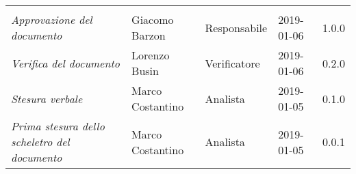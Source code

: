 \newpage 
\section*{}
\begin{table}[H]
	\centering
	\begin{tabular}{p{4cm}|C{3cm}|C{3cm}|R{2.5cm}|R{2cm}}
		
		 & & & & \\
		
		
		\emph{Approvazione del documento} &  Giacomo Barzon & Responsabile & 2019-01-06 & 1.0.0 \\
		\hline
		
		\emph{Verifica del documento} & Lorenzo Busin & Verificatore & 2019-01-06 & 0.2.0 \\
		\hline

		\emph{Stesura verbale} & Marco Costantino & Analista & 2019-01-05 & 0.1.0 \\
		\hline
		
		\emph{Prima stesura dello scheletro del documento} & Marco Costantino & Analista & 2019-01-05 & 0.0.1 \\
		
	\end{tabular}
	
\end{table}


\clearpage